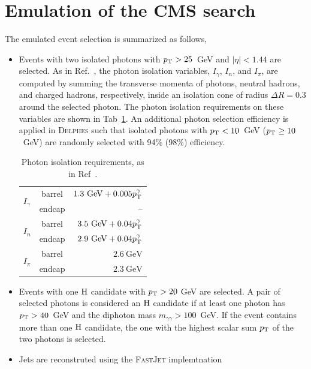 \section{Emulation of the CMS search}
\label{sec:analysis}

The emulated event selection is summarized as follows,
\begin{itemize}
\item Events with two isolated photons with $p_{\mathrm{T}}>25$~GeV and
  $|\eta|<1.44$ are selected. As in Ref.~\cite{CMSPhoton}, the photon
  isolation variables, $I_{\gamma}$, $I_{n}$, and $I_{\pi}$, are
  computed by summing the transverse momenta of photons, neutral
  hadrons, and charged hadrons, respectively, inside an isolation
  cone of radius $\Delta R=0.3$ around the selected photon. The photon
  isolation requirements on these variables
  are shown in Tab~\ref{tab:isolation}. An additional photon selection
  efficiency is applied in \textsc{Delphes} such that isolated photons with $p_{\mathrm{T}}<10$~GeV ($p_{\mathrm{T}}\geq10$~GeV) are
  randomly selected with 94\% (98\%) efficiency.
\begin{table}
\caption{\label{tab:isolation}Photon isolation requirements, as in Ref~\cite{CMSPhoton}.}
\begin{tabular}{lc|r}
 \multirow{2}{*}{$I_{\gamma}$} & barrel & $1.3~\textrm{GeV} + 0.005p_{\mathrm{T}}^{\gamma}$\\
 & endcap & -- \\\hline
 \multirow{2}{*}{$I_{n}$} & barrel & $3.5~\textrm{GeV} + 0.04p_{\mathrm{T}}^{\gamma}$\\
 & endcap &  $2.9~\textrm{GeV} + 0.04p_{\mathrm{T}}^{\gamma}$ \\\hline
 \multirow{2}{*}{$I_{\pi}$} & barrel & $2.6~\textrm{GeV}$\\
 & endcap &  $2.3~\textrm{GeV}$ \\
\end{tabular}
\end{table}
\item Events with one $\mathrm{H}$ candidate with $p_{\mathrm{T}}>20$ GeV are selected. A pair of selected
  photons is considered an $\mathrm{H}$ candidate if at
  least one photon has $p_{\mathrm{T}}>40$~GeV and the diphoton mass
  $m_{\gamma\gamma}>100$~GeV. If the event contains more than one $\mathrm{H}$ candidate,
  the one with the highest scalar sum $p_{\mathrm{T}}$ of the two photons is selected. 
\item Jets are reconstruted using the \textsc{FastJet}\cite{FastJet} implemtnation

\end{itemize}
